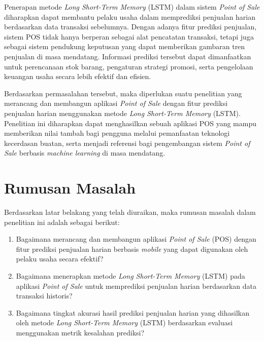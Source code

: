Penerapan metode \textit{Long Short-Term Memory} (LSTM) dalam sistem \textit{Point of Sale} diharapkan dapat membantu pelaku usaha dalam memprediksi penjualan harian berdasarkan data transaksi sebelumnya. Dengan adanya fitur prediksi penjualan, sistem POS tidak hanya berperan sebagai alat pencatatan transaksi, tetapi juga sebagai sistem pendukung keputusan yang dapat memberikan gambaran tren penjualan di masa mendatang. Informasi prediksi tersebut dapat dimanfaatkan untuk perencanaan stok barang, pengaturan strategi promosi, serta pengelolaan keuangan usaha secara lebih efektif dan efisien.

Berdasarkan permasalahan tersebut, maka diperlukan suatu penelitian yang merancang dan membangun aplikasi \textit{Point of Sale} dengan fitur prediksi penjualan harian menggunakan metode \textit{Long Short-Term Memory} (LSTM). Penelitian ini diharapkan dapat menghasilkan sebuah aplikasi POS yang mampu memberikan nilai tambah bagi pengguna melalui pemanfaatan teknologi kecerdasan buatan, serta menjadi referensi bagi pengembangan sistem \textit{Point of Sale} berbasis \textit{machine learning} di masa mendatang.

\section{Rumusan Masalah}
Berdasarkan latar belakang yang telah diuraikan, maka rumusan masalah dalam penelitian ini adalah sebagai berikut:
\begin{enumerate}
    \item Bagaimana merancang dan membangun aplikasi \textit{Point of Sale} (POS) dengan fitur prediksi penjualan harian berbasis \textit{mobile} yang dapat digunakan oleh pelaku usaha secara efektif?
    \item Bagaimana menerapkan metode \textit{Long Short-Term Memory} (LSTM) pada aplikasi \textit{Point of Sale} untuk memprediksi penjualan harian berdasarkan data transaksi historis?
    \item Bagaimana tingkat akurasi hasil prediksi penjualan harian yang dihasilkan oleh metode \textit{Long Short-Term Memory} (LSTM) berdasarkan evaluasi menggunakan metrik kesalahan prediksi?
\end{enumerate}

